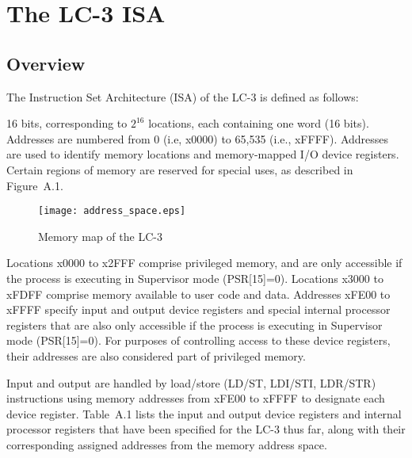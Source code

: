 \documentclass{patt}
\begin{document}
\appendix
\setcounter{chapter}{1}

\chapter*{The LC-3 ISA}

\renewcommand{\thefootnote}{\fnsymbol{footnote}}

\vspace{-6pt}

\section{Overview}

The Instruction Set Architecture (ISA) of the LC-3 is
defined as follows:

\begin{description}
\item[Memory address space] 16 bits,
corresponding to $2^{16}$ locations, each containing one word (16
bits). Addresses are numbered from 0 (i.e, x0000) to 65,535 (i.e.,
xFFFF). Addresses are used to identify memory locations and memory-mapped
I/O device registers. Certain regions of memory are reserved for special uses,
as described in Figure~A.1.

\begin{figure}
\vspace{-12pt}
\centerline{\texttt{[image: address\_space.eps]}}
\caption{Memory map of the LC-3}
\end{figure}

Locations x0000 to x2FFF comprise privileged memory, and are only accessible
if the process is executing in Supervisor mode (PSR[15]=0).  Locations x3000 to
xFDFF comprise memory available to user code and data.  Addresses xFE00 to xFFFF
specify input and output device registers and special internal processor registers that are also only accessible if the process is executing in Supervisor
mode (PSR[15]=0).  For purposes of controlling access to these device registers,
their addresses are also considered part of privileged memory.

\item[Memory-mapped I/O] Input and output are handled by load/store (LD/ST, 
LDI/STI, LDR/STR) instructions using memory addresses from xFE00 to xFFFF to 
designate each device register.  Table~A.1 lists the input and output device 
registers and internal processor registers that have been specified for the 
LC-3 thus far, along with their corresponding assigned addresses from 
the memory address space.


\end{description}
\end{document}

